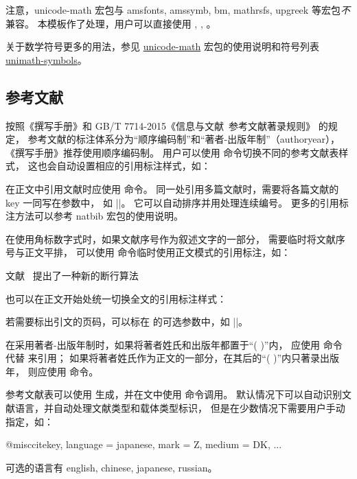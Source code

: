 \documentclass[a4paper]{ltxdoc}
\makeatletter
\DeclareRobustCommand\pkg{\textsf}
\def\DescribeOption{\leavevmode\@bsphack\begingroup\MakePrivateLetters
  \Describe@Option}
\def\Describe@Option#1{\endgroup
              \marginpar{\raggedleft\PrintDescribeOption{#1}}%
              \SpecialEnvIndex{#1}\@esphack\ignorespaces}
\makeatother
\begin{document}
注意，\pkg{unicode-math} 宏包与 \pkg{amsfonts}, \pkg{amssymb}, \pkg{bm},
\pkg{mathrsfs}, \pkg{upgreek} 等宏包\emph{不}兼容。
本模板作了处理，用户可以直接使用 , ,
。

关于数学符号更多的用法，参见
\href{http://mirrors.ctan.org/macros/latex/contrib/unicode-math/unicode-math.pdf}{\pkg{unicode-math}}
宏包的使用说明和符号列表
\href{http://mirrors.ctan.org/macros/latex/contrib/unicode-math/unimath-symbols.pdf}{\pkg{unimath-symbols}}。


\subsection{参考文献}

\DescribeMacro{}
按照《撰写手册》和 GB/T 7714-2015《信息与文献\ 参考文献著录规则》 的规定，
参考文献的标注体系分为“顺序编码制”和“著者-出版年制”（authoryear），
《撰写手册》推荐使用顺序编码制。
用户可以使用  命令切换不同的参考文献表样式，
这也会自动设置相应的引用标注样式，如：
\begin{latex}
    
\end{latex}

\DescribeMacro{\cite}
在正文中引用文献时应使用  命令。
同一处引用多篇文献时，需要将各篇文献的 key 一同写在参数中，
如 |\cite{knuth84,lamport94,mittelbach04}|。
它可以自动排序并用处理连续编号。
更多的引用标注方法可以参考 \pkg{natbib} 宏包的使用说明。

\DescribeMacro{\inlinecite}
\DescribeOption{cite-style}
在使用角标数字式时，如果文献序号作为叙述文字的一部分，
需要临时将文献序号与正文平排，
可以使用  命令临时使用正文模式的引用标注，如：
\begin{latex}
    文献~ 提出了一种新的断行算法
\end{latex}
也可以在正文开始处统一切换全文的引用标注样式：
\begin{latex}
    \nuaasetup{}
    cite-style = inline,
    }
\end{latex}

若需要标出引文的页码，可以标在  的可选参数中，如 |\cite[42]{abc}|。

\DescribeMacro{\citep}
\DescribeMacro{\citet}
在采用著者-出版年制时，如果将著者姓氏和出版年都置于“( )”内，
应使用  命令代替  来引用；
如果将著者姓氏作为正文的一部分，在其后的“( )”内只著录出版年，
则应使用  命令。

\DescribeMacro{}
参考文献表可以使用 \BibTeX{} 生成，并在文中使用  命令调用。
\BibTeX{} 默认情况下可以自动识别文献语言，并自动处理文献类型和载体类型标识，
但是在少数情况下需要用户手动指定，如：
\begin{latex}
    @misc{citekey,
        language = {japanese},
        mark     = {Z},
        medium   = {DK},
        ...
    }
\end{latex}
可选的语言有 english, chinese, japanese, russian。
\end{document}
